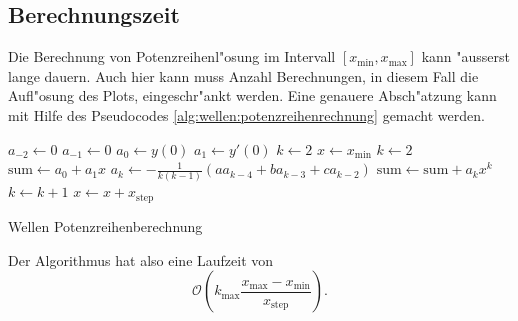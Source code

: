 \subsection{Berechnungszeit}
Die Berechnung von Potenzreihenl"osung im Intervall
$[x_{\text{min}},x_{\text{max}}]$ kann "ausserst lange dauern. Auch hier kann
muss Anzahl Berechnungen, in diesem Fall die Aufl"osung des Plots,
eingeschr"ankt werden. Eine genauere Absch"atzung kann mit Hilfe des
Pseudocodes \ref{alg:wellen:potenzreihenrechnung} gemacht werden.

\begin{algorithm}
	\begin{algorithmic}[1]
		\State $a_{-2} \gets 0$
		\State $a_{-1} \gets 0$
		\State $a_0 \gets y(0)$
		\State $a_1 \gets y'(0)$
		\State $k \gets 2$
		\State $x \gets x_{\text{min}}$
			\State $k \gets 2$
			\State $\text{sum} \gets a_0 + a_1x$
				\State $a_k \gets -\frac{1}{k(k-1)}			
				(aa_{k-4}+ba_{k-3}+ca_{k-2})$
				\State $\text{sum} \gets \text{sum} + a_k x^k$
				\State $k \gets k + 1$
			\EndFor
			\State $x \gets x + x_{\text{step}}$
		\EndFor
	\end{algorithmic}
	\caption{Wellen Potenzreihenberechnung} 
	\label{alg:wellen:potenzreihenrechnung}
\end{algorithm}

Der Algorithmus hat also eine Laufzeit von
\begin{equation*}
	\mathcal{O}\left(k_{\text{max}}\frac{x_{\text{max}}-x_{\text{min}}} 
	{x_{\text{step}}}\right).
\end{equation*}
